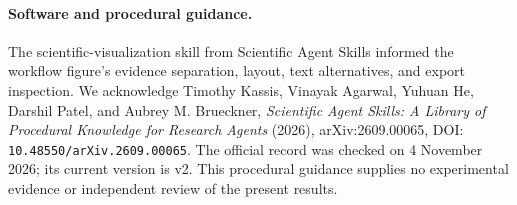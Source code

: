 \paragraph{Software and procedural guidance.}
The scientific-visualization skill from Scientific Agent Skills informed the workflow figure's evidence separation, layout, text alternatives, and export inspection. We acknowledge Timothy Kassis, Vinayak Agarwal, Yuhuan He, Darshil Patel, and Aubrey M. Brueckner, \emph{Scientific Agent Skills: A Library of Procedural Knowledge for Research Agents} (2026), arXiv:2609.00065, DOI: \texttt{10.48550/arXiv.2609.00065}. The official record was checked on 4 November 2026; its current version is v2. This procedural guidance supplies no experimental evidence or independent review of the present results.
